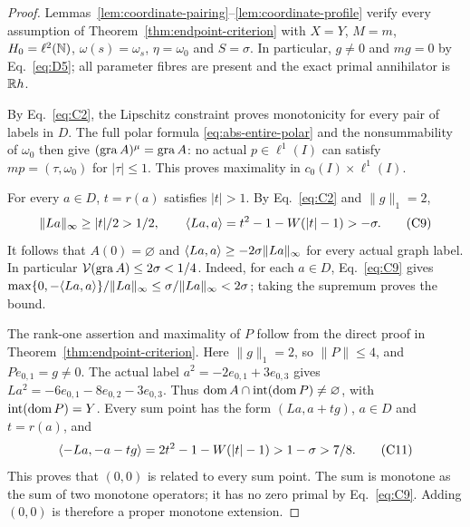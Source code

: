 \begin{proof}
Lemmas~\ref{lem:coordinate-pairing}--\ref{lem:coordinate-profile}
verify every assumption of Theorem~\ref{thm:endpoint-criterion}
with $X=Y$, $M=m$, $H_0=\ell^2(\mathbb N)$, $\omega(s)=\omega_s$,
$\eta=\omega_0$ and $S=\sigma$. In particular, $g\ne0$ and $mg=0$
by Eq.~\eqref{eq:D5}; all parameter fibres are present and the
exact primal annihilator is $\mathbb R h$.

By Eq.~\eqref{eq:C2}, the Lipschitz constraint proves monotonicity
for every pair of labels in $D$. The full polar formula
\eqref{eq:abs-entire-polar} and the nonsummability of $\omega_0$
then give $(\operatorname{gra} A)^\mu=\operatorname{gra} A$: no actual $p\in\ell^1(I)$ can
satisfy $mp=(\tau,\omega_0)$ for $|\tau|\le1$. This proves
maximality in $c_0(I)\times\ell^1(I)$.

\label{sec:C5}
For every $a\in D$, $t=r(a)$ satisfies $|t|>1$. By Eq.~\eqref{eq:C2}
and $\|g\|_1=2$,
\begin{equation}
\|La\|_\infty\ge|t|/2>1/2,\qquad
\langle La,a\rangle=t^2-1-W(|t|-1)>-\sigma.
\tag{C9}\label{eq:C9}
\end{equation}
It follows that $A(0)=\varnothing$ and
$\langle La,a\rangle\ge-2\sigma\|La\|_\infty$ for every actual graph label.
In particular $\mathcal V(\operatorname{gra} A)\le2\sigma<1/4$.
Indeed, for each $a\in D$, Eq.~\eqref{eq:C9} gives
$\max\{0,-\langle La,a\rangle\}/\|La\|_\infty
\le\sigma/\|La\|_\infty<2\sigma$; taking the supremum proves the bound.

\label{sec:C6}
The rank-one assertion and maximality of $P$ follow from the direct
proof in Theorem~\ref{thm:endpoint-criterion}. Here $\|g\|_1=2$,
so $\|P\|\le4$, and $Pe_{0,1}=g\ne0$.
The actual label $a^2=-2e_{0,1}+3e_{0,3}$ gives
$La^2=-6e_{0,1}-8e_{0,2}-3e_{0,3}$. Thus
$\operatorname{dom} A\cap\operatorname{int}(\operatorname{dom} P)\ne\varnothing$, with
$\operatorname{int}(\operatorname{dom} P)=Y$. Every sum point has the form
$(La,a+tg)$, $a\in D$ and $t=r(a)$, and
\begin{equation}
\langle -La,-a-tg\rangle=2t^2-1-W(|t|-1)>1-\sigma>7/8.
\tag{C11}\label{eq:C11}
\end{equation}
This proves that $(0,0)$ is related to every sum point. The sum is
monotone as the sum of two monotone operators; it has no zero primal by
Eq.~\eqref{eq:C9}. Adding $(0,0)$ is therefore a proper monotone extension.

\end{proof}

